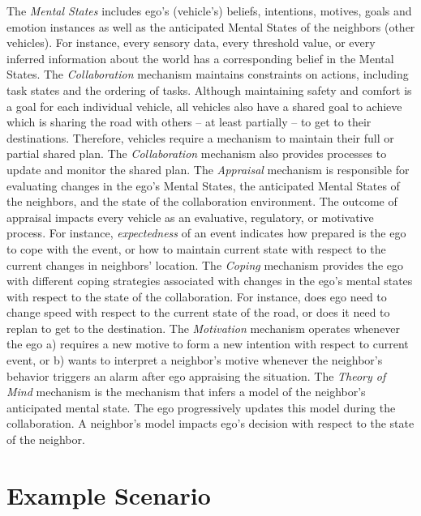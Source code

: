 \documentclass[journal, 11pt]{IEEEtran}
\begin{document}
The \textit{Mental States} includes ego's (vehicle's) beliefs, intentions,
motives, goals and emotion instances as well as the anticipated Mental States of
the neighbors (other vehicles). For instance, every sensory data, every
threshold value, or every inferred information about the world has a
corresponding belief in the Mental States. The \textit{Collaboration} mechanism
maintains constraints on actions, including task states and the ordering of
tasks. Although maintaining safety and comfort is a goal for each individual
vehicle, all vehicles also have a shared goal to achieve which is sharing the
road with others -- at least partially -- to get to their destinations.
Therefore, vehicles require a mechanism to maintain their full or partial shared
plan. The \textit{Collaboration} mechanism also provides processes to update and
monitor the shared plan. The \textit{Appraisal} mechanism is responsible for
evaluating changes in the ego's Mental States, the anticipated Mental States of
the neighbors, and the state of the collaboration environment. The outcome of
appraisal impacts every vehicle as an evaluative, regulatory, or motivative
process. For instance, \textit{expectedness} of an event indicates how prepared
is the ego to cope with the event, or how to maintain current state with respect
to the current changes in neighbors' location. The \textit{Coping} mechanism
provides the ego with different coping strategies associated with changes in the
ego's mental states with respect to the state of the collaboration. For
instance, does ego need to change speed with respect to the current state of
the road, or does it need to replan to get to the destination. The
\textit{Motivation} mechanism operates whenever the ego a) requires a new
motive to form a new intention with respect to current event, or b) wants to
interpret a neighbor's motive whenever the neighbor's behavior triggers an
alarm after ego appraising the situation. The \textit{Theory of Mind} mechanism
is the mechanism that infers a model of the neighbor's anticipated mental state.
The ego progressively updates this model during the collaboration. A neighbor's
model impacts ego's decision with respect to the state of the neighbor.

\section{Example Scenario}
\label{sec:example-scenario}
\end{document}
